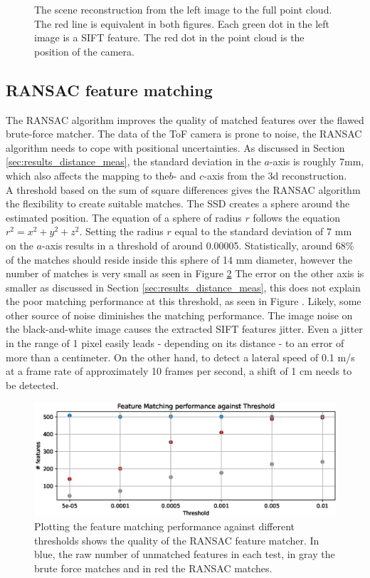 \begin{figure}[H]
\begin{minipage}[b]{0.47\textwidth}
      \label{fig:linearity3d_cloud} 
    \end{minipage}
    \caption{The scene reconstruction from the left image to the full point cloud. The red line is equivalent in both figures. Each green dot in the left image is a SIFT feature. The red dot in the point cloud is the position of the camera.}
    \label{fig:linearity3d}
  \end{figure}
\newpage
\subsection{RANSAC feature matching}
\label{sec:RANSAC_Results}
The RANSAC algorithm improves the quality of matched features over the flawed brute-force matcher. The data of the ToF camera is prone to noise, the RANSAC algorithm needs to cope with positional uncertainties. As discussed in Section \ref{sec:results_distance_meas}, the standard deviation in the $a$-axis is roughly 7mm, which also affects the mapping to the$b$- and $c$-axis from the 3d reconstruction.\\
A threshold based on the sum of square differences gives the RANSAC algorithm the flexibility to create suitable matches.
The SSD creates a sphere around the estimated position. The equation of a sphere of radius $r$ follows the equation $r^{2}=x^{2}+y^{2}+z^{2}$. Setting the radius $r$ equal to the standard deviation of 7 mm on the $a$-axis results in a threshold of around 0.00005. Statistically, around 68\% of the matches should reside inside this sphere of 14 mm diameter, however the number of matches is very small as seen in Figure \ref{im:noise_against_thresh} The error on the other axis is smaller as discussed in Section \ref{sec:results_distance_meas}, this does not explain the poor matching performance at this threshold, as seen in Figure . Likely, some other source of noise diminishes the matching performance. The image noise on the black-and-white image causes the extracted SIFT features jitter. Even a jitter in the range of 1 pixel easily leads - depending on its distance - to an error of more than a centimeter. On the other hand, to detect a lateral speed of 0.1 m/s at a frame rate of approximately 10 frames per second, a shift of 1 cm needs to be detected.
\begin{figure}[H]
    \centering
    \includegraphics[width=1.0\textwidth]{images/noise_against_threshold.eps}
    \caption{Plotting the feature matching performance against different thresholds shows the quality of the RANSAC feature matcher. In blue, the raw number of unmatched features in each test, in gray the brute force matches and in red the RANSAC matches.}
    \label{im:noise_against_thresh}
\end{figure}
